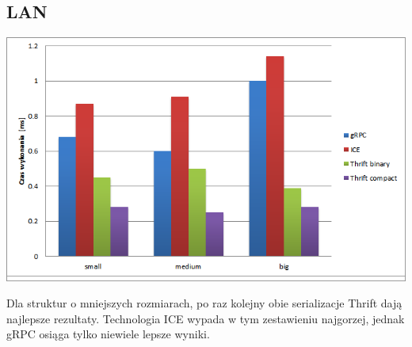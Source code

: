 \documentclass[12pt]{article}
\begin{document}
\subsection{LAN}
\begin{center}
\centering
    \includegraphics{lan_seq5.png}
\end{center}

Dla struktur o mniejszych rozmiarach, po raz kolejny obie serializacje Thrift dają najlepsze rezultaty. Technologia ICE wypada w tym zestawieniu najgorzej, jednak gRPC osiąga tylko niewiele lepsze wyniki.
\end{document}
